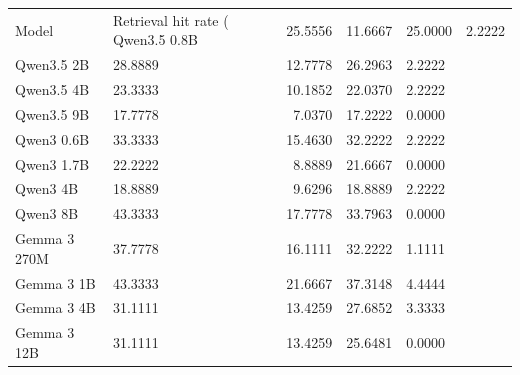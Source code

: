 \begin{tabular}{llrrl}
\toprule
Model & Retrieval hit rate (%
\midrule
Qwen3.5 0.8B & 25.5556 & 11.6667 & 25.0000 & 2.2222 \\
Qwen3.5 2B & 28.8889 & 12.7778 & 26.2963 & 2.2222 \\
Qwen3.5 4B & 23.3333 & 10.1852 & 22.0370 & 2.2222 \\
Qwen3.5 9B & 17.7778 & 7.0370 & 17.2222 & 0.0000 \\
Qwen3 0.6B & 33.3333 & 15.4630 & 32.2222 & 2.2222 \\
Qwen3 1.7B & 22.2222 & 8.8889 & 21.6667 & 0.0000 \\
Qwen3 4B & 18.8889 & 9.6296 & 18.8889 & 2.2222 \\
Qwen3 8B & 43.3333 & 17.7778 & 33.7963 & 0.0000 \\
Gemma 3 270M & 37.7778 & 16.1111 & 32.2222 & 1.1111 \\
Gemma 3 1B & 43.3333 & 21.6667 & 37.3148 & 4.4444 \\
Gemma 3 4B & 31.1111 & 13.4259 & 27.6852 & 3.3333 \\
Gemma 3 12B & 31.1111 & 13.4259 & 25.6481 & 0.0000 \\
\bottomrule
\end{tabular}
